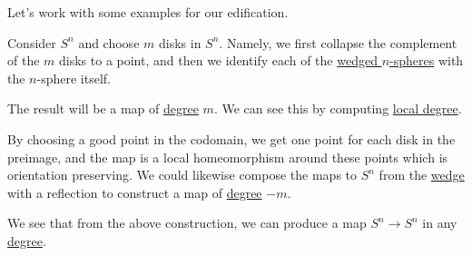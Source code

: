 Let's work with some examples for our edification.
\begin{eg}
	Consider \(S^n\) and choose \(m\) disks in \(S^n\). Namely, we first collapse the complement of the \(m\) disks to a point, and then we identify each of
	the \hyperref[CW-complex-wedge-sum]{wedged \(n\)-spheres} with the \(n\)-sphere itself.
	\begin{figure}[H]
		\centering
		\label{fig:eg:degree-m-map-disks}
	\end{figure}
	The result will be a map of \hyperref[def:degree]{degree} \(m\). We can see this by computing \hyperref[def:local-degree]{local degree}.
	\begin{figure}[H]
		\centering
		\label{fig:eg:degree-m-map-disks-computation}
	\end{figure}
	By choosing a good point in the codomain, we get one point for each disk in the preimage, and the map is a local homeomorphism around these
	points which is orientation preserving. We could likewise compose the maps to \(S^n\) from the \hyperref[CW-complex-wedge-sum]{wedge} with a reflection to
	construct a map of \hyperref[def:degree]{degree} \(-m\).
\end{eg}
\begin{remark}
	We see that from the above construction, we can produce a map \(S^n \to S^n\) in any \hyperref[def:degree]{degree}.
\end{remark}